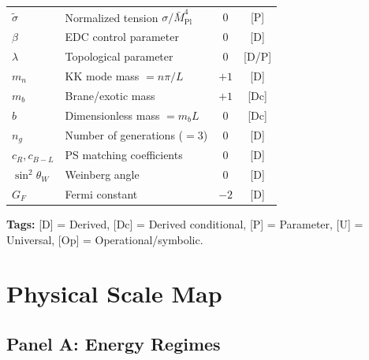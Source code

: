 \documentclass[11pt,a4paper]{article}
\begin{document}
\begin{longtable}{lp{5cm}cc}
$\tilde{\sigma}$ & Normalized tension $\sigma/\bar{M}_{\text{Pl}}^4$ & $0$ & [P] \\
$\beta$ & EDC control parameter & $0$ & [D] \\
$\lambda$ & Topological parameter & $0$ & [D/P] \\
$m_n$ & KK mode mass $= n\pi/L$ & $+1$ & [D] \\
$m_b$ & Brane/exotic mass & $+1$ & [Dc] \\
$b$ & Dimensionless mass $= m_b L$ & $0$ & [Dc] \\
$n_g$ & Number of generations ($=3$) & $0$ & [D] \\
$c_R, c_{B-L}$ & PS matching coefficients & $0$ & [D] \\
$\sin^2\theta_W$ & Weinberg angle & $0$ & [D] \\
$G_F$ & Fermi constant & $-2$ & [D] \\
\end{longtable}

\textbf{Tags:} [D] = Derived, [Dc] = Derived conditional, [P] = Parameter, [U] = Universal, [Op] = Operational/symbolic.

\section{Physical Scale Map}
\label{sec:scale-map}

\subsection{Panel A: Energy Regimes}
\label{subsec:panel-a}
\end{document}
